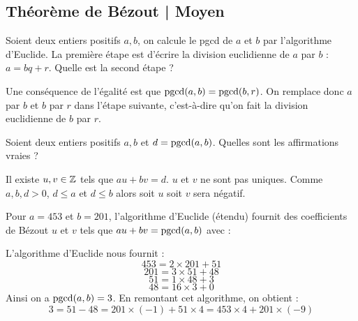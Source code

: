 \subsection{Théorème de Bézout | Moyen}

\begin{question}
    Soient deux entiers positifs $a,b$, on calcule le pgcd de $a$ et $b$ par l'algorithme d'Euclide.
    La première étape est d'écrire la division euclidienne de $a$ par $b$ : $a=bq+r$.
    Quelle est la second étape ?
    \begin{answers} 
    \end{answers}
    \begin{explanations} 
        Une conséquence de l’égalité est que $\mathop{\text{pgcd}}(a,b)=\mathop{\text{pgcd}}(b,r)$. On remplace donc $a$ par $b$ et $b$ par $r$ dans l’étape suivante, c’est-à-dire qu’on fait la division euclidienne de $b$ par $r$.      
    \end{explanations}
\end{question}


\begin{question}
    Soient deux entiers positifs $a,b$ et $d=\mathop{\text{pgcd}}(a,b)$.
    Quelles sont les affirmations vraies ?
    \begin{answers} 
    \end{answers}
    \begin{explanations} 
     Il existe $u,v\in\mathbb{Z}$ tels que $au+bv=d$. $u$ et $v$ ne sont pas uniques. Comme $a,b,d>0$, $d \le a$ et $d \le b$ alors soit $u$ soit $v$ sera négatif.         
    \end{explanations}
\end{question}


\begin{question}
    Pour $a=453$ et $b=201$, l'algorithme d'Euclide (étendu) fournit des coefficients de Bézout $u$ et $v$ tels que $au+bv=\mathop{\text{pgcd}}(a,b)$ avec :
    \begin{answers} 
    \end{answers}
    \begin{explanations} 
        L'algorithme d'Euclide nous fournit :
        $$ 453 = 2 \times 201 + 51$$
        $$201 = 3 \times 51 + 48 $$
        $$ 51 = 1 \times 48 + 3$$
        $$48 = 16 \times 3 + 0 $$
        Ainsi on a $\mathop{\text{pgcd}}(a,b) = 3$. En remontant cet algorithme, on obtient :
        $$ 3 = 51 - 48 = 201 \times (-1) + 51 \times 4 = 453 \times 4 + 201 \times (-9)$$ 
    \end{explanations}
\end{question}


